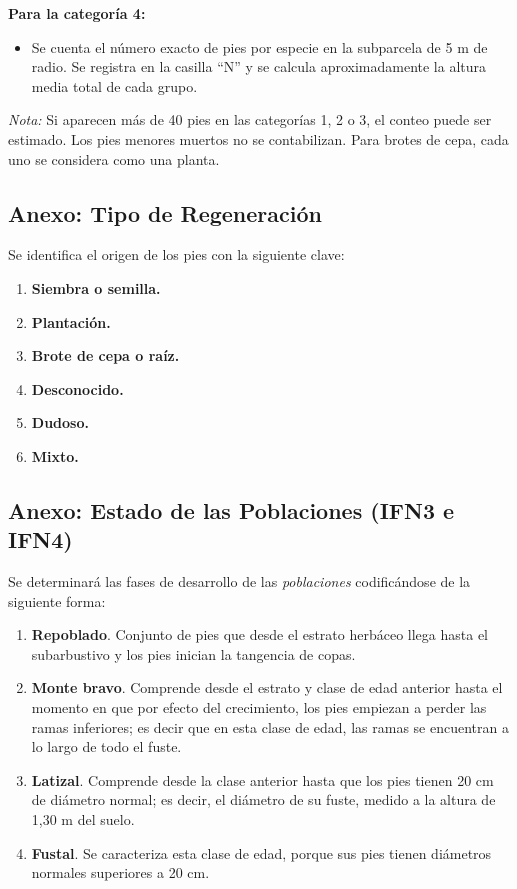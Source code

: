 \textbf{Para la categoría 4:}
\begin{itemize}
    \item Se cuenta el número exacto de pies por especie en la subparcela de 5 m de radio. Se registra en la casilla ``N'' y se calcula aproximadamente la altura media total de cada grupo.
\end{itemize}

\vspace{0.5em}

\textit{Nota:} Si aparecen más de 40 pies en las categorías 1, 2 o 3, el conteo puede ser estimado. Los pies menores muertos no se contabilizan. Para brotes de cepa, cada uno se considera como una planta.




\subsection{Anexo: Tipo de Regeneración}\label{sec:TipoReg}

Se identifica el origen de los pies con la siguiente clave:

\begin{enumerate}
    \item \textbf{Siembra o semilla.}
    \item \textbf{Plantación.}
    \item \textbf{Brote de cepa o raíz.}
    \item \textbf{Desconocido.}
    \item \textbf{Dudoso.}
    \item \textbf{Mixto.}
\end{enumerate}


\subsection{Anexo: Estado de las Poblaciones (IFN3 e IFN4)}\label{sec:EstadoIFN34}

Se determinará las fases de desarrollo de las \textit{poblaciones} codificándose de la siguiente forma:

\begin{enumerate}
    \item \textbf{Repoblado}. Conjunto de pies que desde el estrato herbáceo llega hasta el subarbustivo y los pies inician la tangencia de copas.
    \item \textbf{Monte bravo}. Comprende desde el estrato y clase de edad anterior hasta el momento en que por efecto del crecimiento, los pies empiezan a perder las ramas inferiores; es decir que en esta clase de edad, las ramas se encuentran a lo largo de todo el fuste.
    \item \textbf{Latizal}. Comprende desde la clase anterior hasta que los pies tienen 20 cm de diámetro normal; es decir, el diámetro de su fuste, medido a la altura de 1,30 m del suelo.
    \item \textbf{Fustal}. Se caracteriza esta clase de edad, porque sus pies tienen diámetros normales superiores a 20 cm.
\end{enumerate}


